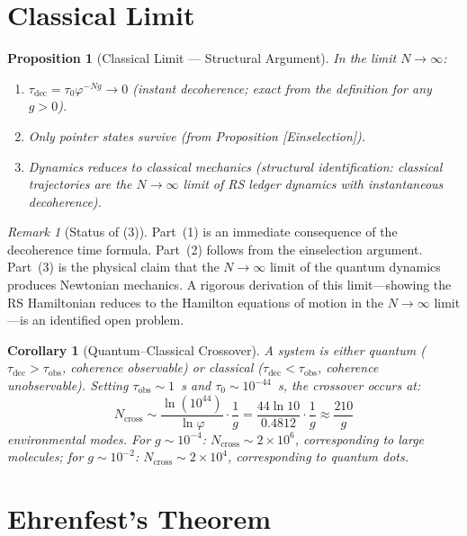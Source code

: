 \documentclass[12pt,a4paper]{article}
\newtheorem{corollary}[theorem]{Corollary}
\newtheorem{proposition}[theorem]{Proposition}
\theoremstyle{definition}
\theoremstyle{remark}
\newtheorem{remark}[theorem]{Remark}
\begin{document}
\section{Classical Limit}

\begin{proposition}[Classical Limit --- Structural Argument]
In the limit $N \to \infty$:
\begin{enumerate}
  \item $\tau_{\mathrm{dec}} = \tau_0 \varphi^{-Ng} \to 0$
  (instant decoherence; exact from the definition for any $g > 0$).
  \item Only pointer states survive (from Proposition [Einselection]).
  \item Dynamics reduces to classical mechanics (structural
  identification: classical trajectories are the $N \to \infty$ limit
  of RS ledger dynamics with instantaneous decoherence).
\end{enumerate}
\end{proposition}

\begin{remark}[Status of (3)]
Part~(1) is an immediate consequence of the decoherence time formula.
Part~(2) follows from the einselection argument.  Part~(3) is the
physical claim that the $N \to \infty$ limit of the quantum dynamics
produces Newtonian mechanics.  A rigorous derivation of this
limit---showing the RS Hamiltonian reduces to the Hamilton equations
of motion in the $N \to \infty$ limit---is an identified open problem.
\end{remark}

\begin{corollary}[Quantum--Classical Crossover]
A system is either quantum ($\tau_{\mathrm{dec}} > \tau_{\mathrm{obs}}$,
coherence observable) or classical ($\tau_{\mathrm{dec}} <
\tau_{\mathrm{obs}}$, coherence unobservable).  Setting
$\tau_{\mathrm{obs}} \sim 1$~s and $\tau_0 \sim 10^{-44}$~s, the
crossover occurs at:
\begin{equation}
  N_{\mathrm{cross}} \sim \frac{\ln(10^{44})}{\ln\varphi} \cdot \frac{1}{g}
  = \frac{44 \ln 10}{0.4812} \cdot \frac{1}{g}
  \approx \frac{210}{g}
\end{equation}
environmental modes.  For $g \sim 10^{-4}$: $N_{\mathrm{cross}}
\sim 2 \times 10^6$, corresponding to large molecules; for
$g \sim 10^{-2}$: $N_{\mathrm{cross}} \sim 2 \times 10^4$,
corresponding to quantum dots.
\end{corollary}

\section{Ehrenfest's Theorem}
\end{document}
